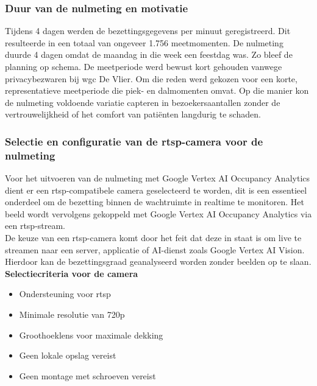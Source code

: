 \subsubsection{Duur van de nulmeting en motivatie}
Tijdens 4 dagen werden de bezettingsgegevens per minuut geregistreerd. Dit resulteerde in een totaal van ongeveer 1.756 meetmomenten. De nulmeting duurde 4 dagen omdat de maandag in die week een feestdag was. Zo bleef de planning op schema. De meetperiode werd bewust kort gehouden vanwege privacybezwaren bij \gls{wgc} De Vlier. Om die reden werd gekozen voor een korte, representatieve meetperiode die piek- en dalmomenten omvat. Op die manier kon de nulmeting voldoende variatie capteren in bezoekersaantallen zonder de vertrouwelijkheid of het comfort van patiënten langdurig te schaden.

\subsubsection{Selectie en configuratie van de \gls{rtsp}-camera voor de nulmeting}
Voor het uitvoeren van de nulmeting met Google Vertex AI Occupancy Analytics dient er een \gls{rtsp}-compatibele camera geselecteerd te worden, dit is een essentieel onderdeel om de bezetting binnen de wachtruimte in realtime te monitoren. Het beeld wordt vervolgens gekoppeld met Google Vertex AI Occupancy Analytics via een \gls{rtsp}-stream. \\

De keuze van een \gls{rtsp}-camera komt door het feit dat deze in staat is om live te streamen naar een server, applicatie of AI-dienst zoals Google Vertex AI Vision. Hierdoor kan de bezettingsgraad geanalyseerd worden zonder beelden op te slaan. \\

\textbf{Selectiecriteria voor de camera}
\begin{itemize}
    \item Ondersteuning voor \gls{rtsp}
    \item Minimale resolutie van 720p
    \item Groothoeklens voor maximale dekking
    \item Geen lokale opslag vereist
    \item Geen montage met schroeven vereist
\end{itemize}
  
